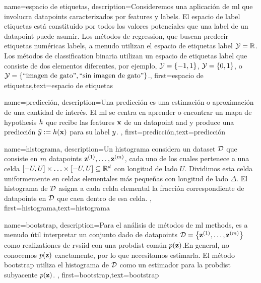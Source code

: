 {name={espacio de etiquetas},
	description={Consideremos una aplicación de \gls{ml} que involucra \gls{datapoint}s caracterizados por \gls{feature}s 
		y \gls{label}s. El espacio de \gls{label} etiquetas está constituido por todos los valores potenciales que una \gls{label} 
		de un \gls{datapoint} puede asumir. Los métodos de \Gls{regression}, que  buscan predecir etiquetas numéricas \gls{label}s, 
		a menudo utilizan el espacio de etiquetas \gls{label} $\mathcal{Y} = \mathbb{R}$. Los métodos de \gls{classification} binaria utilizan un espacio de etiquetas \gls{label}  
		que consiste de dos elementos diferentes, por ejemplo, $\mathcal{Y} =\{-1,1\}$, $\mathcal{Y}=\{0,1\}$, 
		o $\mathcal{Y} = \{ \mbox{``imagen de gato''}, \mbox{``sin imagen de gato''} \}$.}, first={espacio de etiquetas},text={espacio de etiquetas}  
}

{name={predicción},
	description={Una  predicción es una estimación o aproximación de una cantidad de interés.  
		El \Gls{ml} se centra en aprender o encontrar un mapa de \gls{hypothesis} $h$ 
		que recibe las \gls{feature}s ${\bf x}$ de un \gls{datapoint} and y produce una predicción
		$\widehat{y} := h({\bf x})$ para su \gls{label} $y$. },
	first={predicción},text={predicción}  
}

{name={histograma},
	description={Un histograma  considera un \gls{dataset} $\mathcal{D}$ que consiste en $m$ \gls{datapoint}s 
		${\bf z}^{(1)},\ldots,{\bf z}^{(m)}$, cada uno de los cuales pertenece a una celda  
		$[-U,U] \times \ldots \times [-U,U] \subseteq \mathbb{R}^{d}$ con longitud de lado 
		$U$. Dividimos esta celda uniformemente en celdas elementales más pequeñas con longitud de lado 
		$\Delta$. El histograma de $\mathcal{D}$ asigna a cada celda elemental la fracción correspondiente de
		\gls{datapoint}s en $\mathcal{D}$ que caen dentro de esa celda.
	},
	first={histograma},text={histograma}  
}

{name={bootstrap},
	description={Para el análisis de métodos de \gls{ml} methods, es a menudo útil interpretar 
		un conjunto dado de \gls{datapoint}s $\mathcal{D} = \big\{ {\bf z}^{(1)},\ldots,{\bf z}^{(m)}\big\}$ 
		como \gls{realization}es de \gls{rv}s\gls{iid} con una \gls{probdist} común $p({\bf z})$.En general, no conocemos 
		$p({\bf z})$ exactamente, por lo que necesitamos estimarla. El método bootstrap utiliza el histograma de 
		$\mathcal{D}$ como un estimador para la \gls{probdist} subyacente $p({\bf z})$. 
	},
	first={bootstrap},text={bootstrap}  
}

